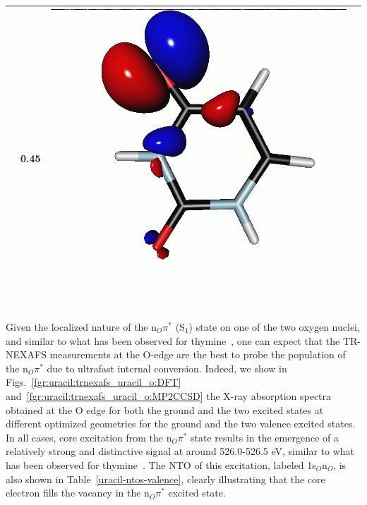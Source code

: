 \documentclass[journal=jctcce,manuscript=article]{achemso}
\begin{document}
\begin{table}[H]
\begin{tabular}{ c | c c c }
\begin{minipage}{0.2\textwidth}
    \end{minipage}
    & 0.45
    &  \begin{minipage}{0.2\textwidth}
        \centering
        \includegraphics[scale=0.10]{NTO/Uracil/S1toCVSp.png}
    \end{minipage}
\\\hline
\end{tabular}
\end{table}


Given the localized nature of the n$_O\pi^{\ast}$ (S$_1$) state
on one of the two oxygen nuclei, and similar to what has been 
observed for thymine~\cite{naturecomm}, one can expect that the
TR-NEXAFS measurements at the O-edge are the best to probe the 
population of the n$_O\pi^{\ast}$ due to ultrafast internal conversion.
Indeed, we show in Figs.~\ref{fgr:uracil:trnexafs_uracil_o:DFT}
and~\ref{fgr:uracil:trnexafs_uracil_o:MP2CCSD}
the X-ray absorption spectra obtained at the O edge for 
both the ground and the two excited states at different optimized geometries for the ground and the two valence excited states.
In all cases, core excitation from the n$_O\pi^*$ state results in 
the emergence of a relatively strong and distinctive signal at around 526.0-526.5 eV, similar to what has been observed for thymine~\cite{naturecomm}.
The NTO of this excitation, labeled 1s$_O$n$_O$, is also shown in 
Table~\ref{uracil-ntos-valence}, clearly illustrating that the core electron fills the vacancy 
in the n$_O\pi^*$ excited state.
\end{document}
